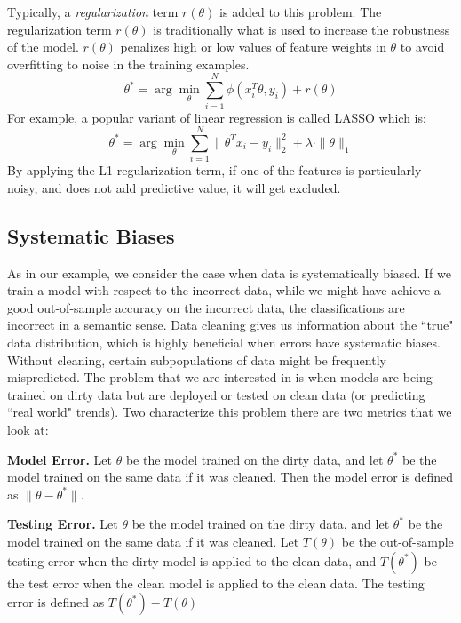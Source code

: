 Typically, a \emph{regularization} term $r(\theta)$ is added to this problem.
The regularization term $r(\theta)$ is traditionally what is used to increase the robustness of the model.
$r(\theta)$ penalizes high or low values of feature weights in $\theta$ to avoid overfitting to noise in the
training examples.
\[
 \theta^{*}=\arg\min_{\theta}\sum_{i=1}^{N}\phi(x_{i}^T\theta,y_{i}) + r(\theta)
\]
For example, a popular variant of linear regression is called LASSO which is:
\[
 \theta^{*}=\arg\min_{\theta}\sum_{i=1}^{N}\|\theta^Tx_{i} - y_i \|_2^2 + \lambda \cdot \|\theta\|_1
\]
By applying the L1 regularization term, if one of the features is particularly noisy, and does not add predictive value, it will get excluded.

\subsection{Systematic Biases}
As in our example, we consider the case when data is systematically biased.
If we train a model with respect to the incorrect data, while we might have achieve a good out-of-sample accuracy on the incorrect data, the classifications are incorrect in a semantic sense.
Data cleaning gives us information about the ``true" data distribution, which is highly beneficial when errors have systematic biases.
Without cleaning, certain subpopulations of data might be frequently mispredicted. 
The problem that we are interested in is when models are being trained on dirty data but are deployed or tested on clean data (or predicting ``real world" trends).
Two characterize this problem there are two metrics that we look at:

\vspace{0.5em}

\noindent\textbf{Model Error. } Let $\theta$ be the model trained on the dirty data, and let $\theta^*$ be the model trained on the same data if it was cleaned. Then the model error is defined as $\|\theta - \theta^*\|$.

\vspace{0.5em}

\noindent\textbf{Testing Error. } Let $\theta$ be the model trained on the dirty data, and let $\theta^*$ be the model trained on the same data if it was cleaned. Let $T(\theta)$ be the out-of-sample testing error when the dirty model is applied to the clean data, and $T(\theta^*)$ be the test error when the clean model is applied to the clean data. The testing error is defined as $T(\theta^*) - T(\theta)$


